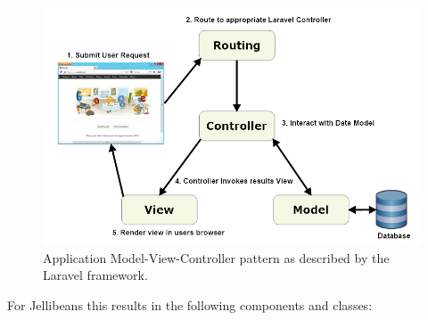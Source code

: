 \documentclass[a4paper, 11pt]{article}
\begin{document}
\begin{figure}[H]
\begin{center}
\includegraphics[scale=0.45]{laravelMVC}
\end{center}
\caption{Application Model-View-Controller pattern as described by the Laravel framework\cite{laravel}.}
\label{laravelMVC}
\end{figure}

For Jellibeans this results in the following components and classes:
\end{document}
